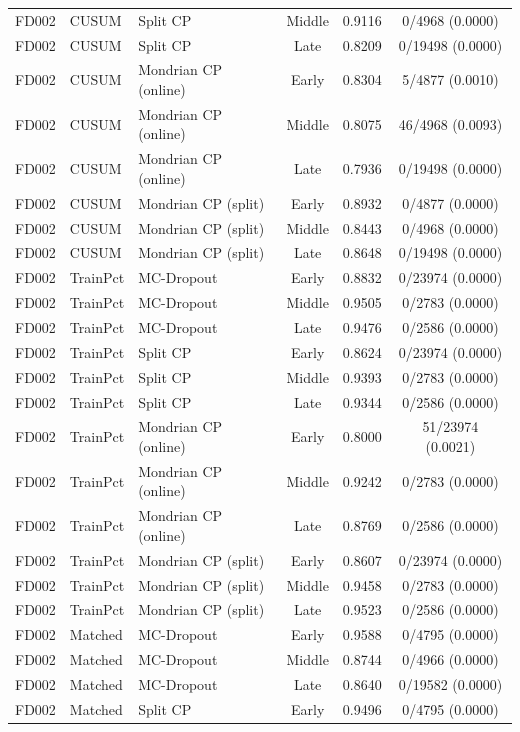 \begin{table}[t]
\begin{tabular}{lllccc}
FD002 & CUSUM & Split CP & Middle & 0.9116 & 0/4968 (0.0000) \\
FD002 & CUSUM & Split CP & Late & 0.8209 & 0/19498 (0.0000) \\
FD002 & CUSUM & Mondrian CP (online) & Early & 0.8304 & 5/4877 (0.0010) \\
FD002 & CUSUM & Mondrian CP (online) & Middle & 0.8075 & 46/4968 (0.0093) \\
FD002 & CUSUM & Mondrian CP (online) & Late & 0.7936 & 0/19498 (0.0000) \\
FD002 & CUSUM & Mondrian CP (split) & Early & 0.8932 & 0/4877 (0.0000) \\
FD002 & CUSUM & Mondrian CP (split) & Middle & 0.8443 & 0/4968 (0.0000) \\
FD002 & CUSUM & Mondrian CP (split) & Late & 0.8648 & 0/19498 (0.0000) \\
FD002 & TrainPct & MC-Dropout & Early & 0.8832 & 0/23974 (0.0000) \\
FD002 & TrainPct & MC-Dropout & Middle & 0.9505 & 0/2783 (0.0000) \\
FD002 & TrainPct & MC-Dropout & Late & 0.9476 & 0/2586 (0.0000) \\
FD002 & TrainPct & Split CP & Early & 0.8624 & 0/23974 (0.0000) \\
FD002 & TrainPct & Split CP & Middle & 0.9393 & 0/2783 (0.0000) \\
FD002 & TrainPct & Split CP & Late & 0.9344 & 0/2586 (0.0000) \\
FD002 & TrainPct & Mondrian CP (online) & Early & 0.8000 & 51/23974 (0.0021) \\
FD002 & TrainPct & Mondrian CP (online) & Middle & 0.9242 & 0/2783 (0.0000) \\
FD002 & TrainPct & Mondrian CP (online) & Late & 0.8769 & 0/2586 (0.0000) \\
FD002 & TrainPct & Mondrian CP (split) & Early & 0.8607 & 0/23974 (0.0000) \\
FD002 & TrainPct & Mondrian CP (split) & Middle & 0.9458 & 0/2783 (0.0000) \\
FD002 & TrainPct & Mondrian CP (split) & Late & 0.9523 & 0/2586 (0.0000) \\
FD002 & Matched & MC-Dropout & Early & 0.9588 & 0/4795 (0.0000) \\
FD002 & Matched & MC-Dropout & Middle & 0.8744 & 0/4966 (0.0000) \\
FD002 & Matched & MC-Dropout & Late & 0.8640 & 0/19582 (0.0000) \\
FD002 & Matched & Split CP & Early & 0.9496 & 0/4795 (0.0000) \\

\end{tabular}
\end{table}
